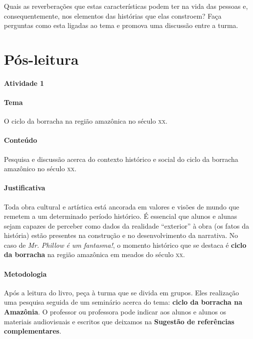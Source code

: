 \documentclass[11pt]{extarticle}
\begin{document}
Quais as reverberações que estas características podem ter na vida das pessoas e, 
consequentemente, nos elementos das histórias que elas constroem? 
Faça perguntas como esta ligadas ao tema e promova uma discussão entre a turma.  


\section{Pós-leitura}


\paragraph{Atividade 1} 

\paragraph{Tema} O ciclo da borracha na região amazônica no século \textsc{xx}.

\paragraph{Conteúdo}Pesquisa e discussão acerca do contexto histórico e social 
do ciclo da borracha amazônico no século \textsc{xx}.

\paragraph{Justificativa} Toda obra cultural e artística está ancorada em valores e 
visões de mundo que remetem a um determinado período histórico. 
É essencial que alunos e alunas sejam capazes de perceber como 
dados da realidade ``exterior'' à obra (os fatos da história) estão
presentes na construção e no desenvolvimento da narrativa. No caso 
de \textit{Mr. Phillow é um fantasma!}, o momento histórico que se 
destaca é \textbf{ciclo da borracha} na região amazônica em meados
do século \textsc{xx}.

\paragraph{Metodologia} Após a leitura do livro, peça à turma que se divida em grupos.
Eles realização uma pesquisa seguida de um seminário acerca do tema: \textbf{ciclo da borracha na Amazônia}.
O professor ou professora pode indicar aos alunos e alunos os materiais 
audiovisuais e escritos que deixamos na \textbf{Sugestão de referências complementares}.
\end{document}
